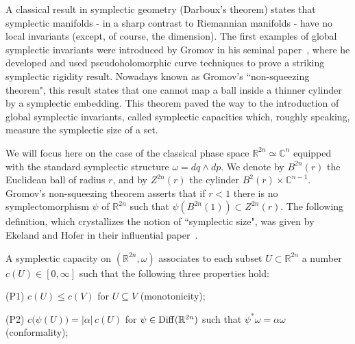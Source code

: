 \documentclass{icmart}
\theoremstyle{definition}
\newtheorem{definition}[theorem]{Definition}
\begin{document}
A classical result in symplectic geometry (Darboux's theorem) states that symplectic manifolds - in a sharp contrast
to Riemannian manifolds - have no local invariants (except, of course, the dimension). The first examples
of global symplectic invariants were introduced by Gromov in his seminal paper~\cite{Gr}, where
he developed and used pseudoholomorphic curve techniques to prove a striking symplectic rigidity result.
Nowadays known as Gromov's ``non-squeezing theorem", this result states that one cannot map a ball inside a thinner cylinder
by a symplectic embedding. %
This theorem paved the way to the introduction
of global symplectic invariants, called symplectic capacities which, roughly speaking, measure the
symplectic size of a set.


\smallskip


We will focus here on the case of the classical phase space ${\mathbb R}^{2n} \simeq {\mathbb C}^n$  equipped with the standard symplectic structure $\omega=dq \wedge dp$. 
We denote by $B^{2n}(r)$ the Euclidean ball of radius $r$, and by $Z^{2n}(r)$ the cylinder $B^{2}(r) \times {\mathbb C}^{n-1}$. 
Gromov's non-squeezing theorem asserts that if $r < 1$ there is no symplectomorphism $\psi$ of ${\mathbb R}^{2n}$ such that $\psi(B^{2n}(1)) \subset Z^{2n}(r)$.
The following definition, which crystallizes the notion of  ``symplectic size", was given by Ekeland and Hofer in their influential paper~\cite{EH}.



%

\smallskip


A symplectic capacity on $({\mathbb R}^{2n},\omega)$ associates
to each  subset $U \subset {\mathbb R}^{2n}$ a number $c(U) \in
[0,\infty]$ such that the following three properties hold:

\smallskip


\noindent (P1) $c(U) \leq c(V)$ for $U \subseteq V$ (monotonicity);

\smallskip


\noindent (P2) $c \big (\psi(U) \big )= |\alpha| \, c(U)$ for  $\psi
\in {\rm Diff} ( {\mathbb R}^{2n} )$ such that $\psi^*\omega=
\alpha  \omega$ (conformality);
\end{document}
